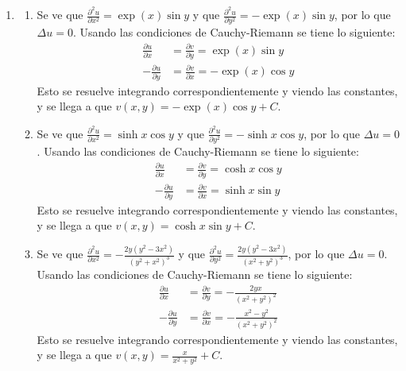 \documentclass{homework}
\begin{document}
\begin{sol}
    \begin{enumerate}[label=(\alph*)]
        \item \begin{enumerate}[label=(\roman*)]
            \item Se ve que \(\frac{\partial^2 u}{\partial x^2}=\exp(x)\sin y\) y que \(\frac{\partial^2 u}{\partial y^2}=-\exp(x)\sin y\), por lo que \(\Delta u=0\). Usando las condiciones de Cauchy-Riemann se tiene lo siguiente:
            \begin{align*}
                \frac{\partial u}{\partial x}&=\frac{\partial v}{\partial y}=\exp(x)\sin y\\
                -\frac{\partial u}{\partial y}&=\frac{\partial v}{\partial x}=-\exp(x)\cos y
            \end{align*}
            Esto se resuelve integrando correspondientemente y viendo las constantes, y se llega a que \(v(x,y)=-\exp(x)\cos y+C\).
            \item Se ve que \(\frac{\partial^2 u}{\partial x^2}=\sinh x\cos y\) y que \(\frac{\partial^2 u}{\partial y^2}=-\sinh x\cos y\), por lo que \(\Delta u=0\). Usando las condiciones de Cauchy-Riemann se tiene lo siguiente:
            \begin{align*}
                \frac{\partial u}{\partial x}&=\frac{\partial v}{\partial y}=\cosh x\cos y\\
                -\frac{\partial u}{\partial y}&=\frac{\partial v}{\partial x}=\sinh x\sin y
            \end{align*}
            Esto se resuelve integrando correspondientemente y viendo las constantes, y se llega a que \(v(x,y)=\cosh x\sin y+C\).
            \item Se ve que \(\frac{\partial^2 u}{\partial x^2}=-\frac{2 y (y^2 - 3 x^2)}{(y^2 + x^2)^3}\) y que \(\frac{\partial^2 u}{\partial y^2}=\frac{2 y (y^2 - 3 x^2)}{(x^2 + y^2)^3}\), por lo que \(\Delta u=0\). Usando las condiciones de Cauchy-Riemann se tiene lo siguiente:
            \begin{align*}
                \frac{\partial u}{\partial x}&=\frac{\partial v}{\partial y}=-\frac{2yx}{(x^2+y^2)^2}\\
                -\frac{\partial u}{\partial y}&=\frac{\partial v}{\partial x}=-\frac{x^2-y^2}{(x^2+y^2)^2}
            \end{align*}
            Esto se resuelve integrando correspondientemente y viendo las constantes, y se llega a que \(v(x,y)=\frac{x}{x^2+y^2}+C\).

\end{enumerate}
\end{enumerate}
\end{sol}
\end{document}
